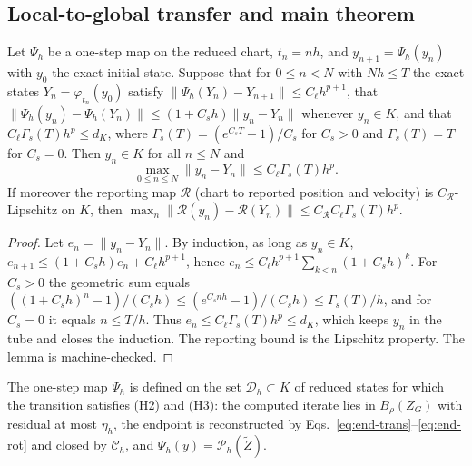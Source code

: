 \subsection{Local-to-global transfer and main theorem}

\begin{lemma}
\label{lem:local-global-transfer}
Let $\Psi_h$ be a one-step map on the reduced chart, $t_n=nh$, and $y_{n+1}=\Psi_h(y_n)$ with $y_0$
the exact initial state. Suppose that for $0\le n<N$ with $Nh\le T$ the exact states
$Y_n=\varphi_{t_n}(y_0)$ satisfy $\|\Psi_h(Y_n)-Y_{n+1}\|\le C_\ell h^{p+1}$, that
$\|\Psi_h(y_n)-\Psi_h(Y_n)\|\le(1+C_sh)\|y_n-Y_n\|$ whenever $y_n\in K$, and that
$C_\ell\Gamma_s(T)h^p\le d_K$, where $\Gamma_s(T)=(e^{C_sT}-1)/C_s$ for $C_s>0$ and
$\Gamma_s(T)=T$ for $C_s=0$. Then $y_n\in K$ for all $n\le N$ and
\begin{equation}
\label{eq:local-global-lemma-grid-bound}
  \max_{0\le n\le N}\|y_n-Y_n\|\le C_\ell\Gamma_s(T)h^p .
\end{equation}
If moreover the reporting map $\mathcal R$ (chart to reported position and velocity) is
$C_{\mathcal R}$-Lipschitz on $K$, then
$\max_n\|\mathcal R(y_n)-\mathcal R(Y_n)\|\le C_{\mathcal R}C_\ell\Gamma_s(T)h^p$.
\end{lemma}

\begin{proof}
Let $e_n=\|y_n-Y_n\|$. By induction, as long as $y_n\in K$,
$e_{n+1}\le(1+C_sh)e_n+C_\ell h^{p+1}$, hence $e_n\le C_\ell h^{p+1}\sum_{k<n}(1+C_sh)^k$. For
$C_s>0$ the geometric sum equals $((1+C_sh)^n-1)/(C_sh)\le(e^{C_snh}-1)/(C_sh)\le\Gamma_s(T)/h$,
and for $C_s=0$ it equals $n\le T/h$. Thus $e_n\le C_\ell\Gamma_s(T)h^p\le d_K$, which keeps $y_n$
in the tube and closes the induction. The reporting bound is the Lipschitz property. The lemma is
machine-checked.
\end{proof}

\begin{definition}
\label{def:accepted-branch-map}
The one-step map $\Psi_h$ is defined on the set $\mathcal D_h\subset K$ of reduced states for which
the transition satisfies (H2) and (H3): the computed iterate lies in $B_\rho(Z_G)$ with residual at
most $\eta_h$, the endpoint is reconstructed by Eqs.~\eqref{eq:end-trans}--\eqref{eq:end-rot} and
closed by $\mathcal C_h$, and $\Psi_h(y)=\mathcal P_h(\widetilde Z)$.
\end{definition}

